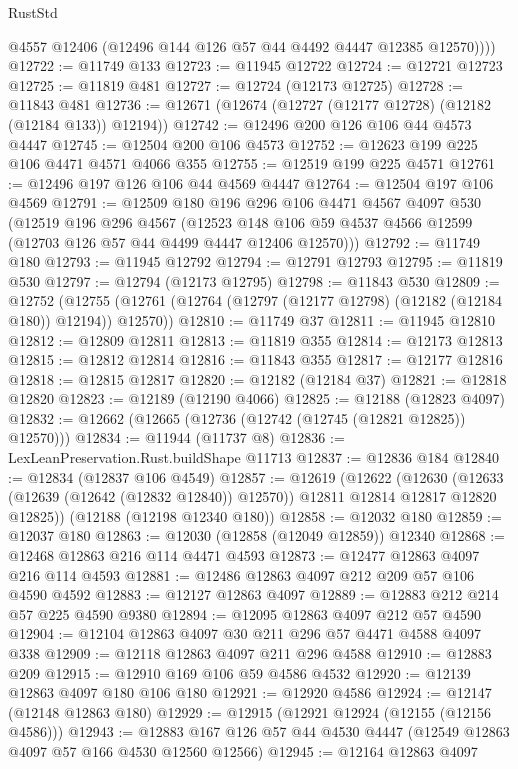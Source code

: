 \begin{lexlean}{RustStd}
\begin{coremodule}
{\begin{coremodule}
{{{{{{{{{{{{{{{{{{{{{{{{{{{{{{{{{{{{{{{{{{{{{{{{{{{{{{{{{{{{{{{{{{{{          @4557
          @12406
          (@12496 @144 @126 @57 @44 @4492 @4447 @12385 @12570))))
@12722 := @11749 @133
@12723 := @11945 @12722
@12724 := @12721 @12723
@12725 := @11819 @481
@12727 := @12724 (@12173 @12725)
@12728 := @11843 @481
@12736 := @12671 (@12674 (@12727 (@12177 @12728) (@12182 (@12184 @133)) @12194))
@12742 := @12496 @200 @126 @106 @44 @4573 @4447
@12745 := @12504 @200 @106 @4573
@12752 := @12623 @199 @225 @106 @4471 @4571 @4066 @355
@12755 := @12519 @199 @225 @4571
@12761 := @12496 @197 @126 @106 @44 @4569 @4447
@12764 := @12504 @197 @106 @4569
@12791 := @12509
    @180
    @196
    @296
    @106
    @4471
    @4567
    @4097
    @530
    (@12519
      @196
      @296
      @4567
      (@12523 @148 @106 @59 @4537 @4566 @12599 (@12703 @126 @57 @44 @4499 @4447 @12406 @12570)))
@12792 := @11749 @180
@12793 := @11945 @12792
@12794 := @12791 @12793
@12795 := @11819 @530
@12797 := @12794 (@12173 @12795)
@12798 := @11843 @530
@12809 := @12752
    (@12755 (@12761 (@12764 (@12797 (@12177 @12798) (@12182 (@12184 @180)) @12194)) @12570))
@12810 := @11749 @37
@12811 := @11945 @12810
@12812 := @12809 @12811
@12813 := @11819 @355
@12814 := @12173 @12813
@12815 := @12812 @12814
@12816 := @11843 @355
@12817 := @12177 @12816
@12818 := @12815 @12817
@12820 := @12182 (@12184 @37)
@12821 := @12818 @12820
@12823 := @12189 (@12190 @4066)
@12825 := @12188 (@12823 @4097)
@12832 := @12662 (@12665 (@12736 (@12742 (@12745 (@12821 @12825)) @12570)))
@12834 := @11944 (@11737 @8)
@12836 := LexLeanPreservation.Rust.buildShape @11713
@12837 := @12836 @184
@12840 := @12834 (@12837 @106 @4549)
@12857 := @12619
    (@12622
      (@12630 (@12633 (@12639 (@12642 (@12832 @12840)) @12570)) @12811 @12814 @12817 @12820 @12825))
    (@12188 (@12198 @12340 @180))
@12858 := @12032 @180
@12859 := @12037 @180
@12863 := @12030 (@12858 (@12049 @12859)) @12340
@12868 := @12468 @12863 @216 @114 @4471 @4593
@12873 := @12477 @12863 @4097 @216 @114 @4593
@12881 := @12486 @12863 @4097 @212 @209 @57 @106 @4590 @4592
@12883 := @12127 @12863 @4097
@12889 := @12883 @212 @214 @57 @225 @4590 @9380
@12894 := @12095 @12863 @4097 @212 @57 @4590
@12904 := @12104 @12863 @4097 @30 @211 @296 @57 @4471 @4588 @4097 @338
@12909 := @12118 @12863 @4097 @211 @296 @4588
@12910 := @12883 @209
@12915 := @12910 @169 @106 @59 @4586 @4532
@12920 := @12139 @12863 @4097 @180 @106 @180
@12921 := @12920 @4586
@12924 := @12147 (@12148 @12863 @180)
@12929 := @12915 (@12921 @12924 (@12155 (@12156 @4586)))
@12943 := @12883 @167 @126 @57 @44 @4530 @4447 (@12549 @12863 @4097 @57 @166 @4530 @12560 @12566)
@12945 := @12164 @12863 @4097
}}}}}}}}}}}}}}}}}}}}}}}}}}}}}}}}}}}}}}}}}}}}}}}}}}}}}}}}}}}}}}}}}}}}
\end{coremodule}}
\end{coremodule}
\end{lexlean}
